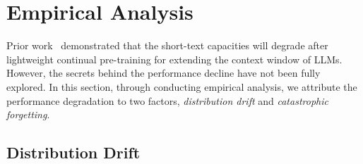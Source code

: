 \section{Empirical Analysis}
\label{sec:analysis}

Prior work~\cite{xiong-naacl-2024-effective,ding-icml-2024-longrope} demonstrated that the short-text capacities will degrade after lightweight continual pre-training for extending the context window of LLMs. However, the secrets behind the performance decline have not been fully explored. In this section, through conducting empirical analysis, we attribute the performance degradation to two factors, \ie \emph{distribution drift} and \emph{catastrophic forgetting}. 







\subsection{Distribution Drift}
\label{sec:drift}





